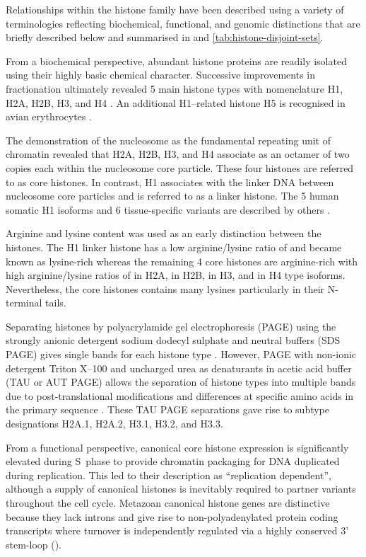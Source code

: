   Relationships within the histone family have been described using a variety of terminologies
  reflecting biochemical, functional, and genomic distinctions that are briefly described below
  and summarised in  and \ref{tab:histone-disjoint-sets}.

  From a biochemical perspective, abundant histone proteins
  are readily isolated using their highly basic chemical character.
  Successive improvements in fractionation ultimately revealed 5 main histone types
  with nomenclature H1, H2A, H2B, H3, and H4 \citep{nomenclature}.
  An additional H1--related histone H5 is recognised in avian erythrocytes \citep{HFive-review}.

  The demonstration of the nucleosome as the fundamental repeating unit of chromatin \citep{Kornberg1974}
  revealed that H2A, H2B, H3, and H4 associate as an octamer of two copies each within the
  nucleosome core particle. These four histones are referred to as core histones.
  In contrast, H1 associates with the linker DNA between nucleosome core particles
  and is referred to as a linker histone.
  The 5 human somatic H1 isoforms and 6 tissue-specific variants are described by others \citep{HarshmanFreitas2013}.

  Arginine and lysine content was used as an early distinction between the histones.
  The H1 linker histone has a low arginine/lysine ratio of \LinkerArgLysRatio{} and became known as lysine-rich
  whereas the remaining 4 core histones are arginine-rich
  with high arginine/lysine ratios of \HTwoAArgLysRatio{} in H2A, \HTwoBArgLysRatio{} in H2B,
  \HThreeArgLysRatio{} in H3, and \HFourArgLysRatio{} in H4 type isoforms.
  Nevertheless, the core histones contains many lysines particularly in their N-terminal tails.

  Separating histones by polyacrylamide gel electrophoresis (PAGE)
  using the strongly anionic detergent sodium dodecyl sulphate and neutral buffers (SDS PAGE)
  gives single bands for each histone type \citep{ShechterHake2007}.
  However, PAGE with non-ionic detergent Triton X--100 and uncharged urea as denaturants
  in acetic acid buffer (TAU or AUT PAGE) allows the separation of histone types into multiple bands
  due to post-translational modifications and differences at specific amino acids
  in the primary sequence \citep{Zweidler1977}.
  These TAU PAGE separations gave rise to subtype designations H2A.1, H2A.2, H3.1, H3.2, and H3.3.

  From a functional perspective, canonical core histone expression
  is significantly elevated during S~phase to provide chromatin packaging
  for DNA duplicated during replication.
  This led to their description as ``replication dependent'',
  although a supply of canonical histones is inevitably required
  to partner variants throughout the cell cycle.
  Metazoan canonical histone genes are distinctive
  because they lack introns and give rise to non-polyadenylated protein coding transcripts
  where turnover is independently regulated via a highly conserved 3' stem-loop ().

